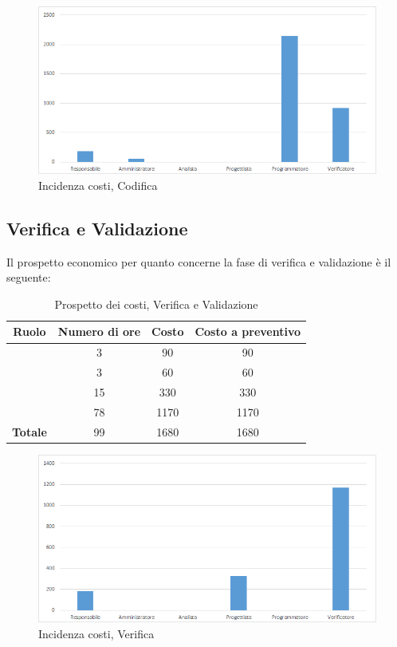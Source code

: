 \begin{figure}[H]
	\centering
	\includegraphics[scale=0.6]{img/8-4.png}
	\caption{Incidenza costi, Codifica}
\end{figure}

\subsection{Verifica e Validazione}
Il prospetto economico per quanto concerne la fase di verifica e validazione è il seguente:


\begin{table}[H]
	\begin{center}
		\begin{tabular}{|c|c|c|c|}
			\hline
			\textbf{Ruolo}	& \textbf{Numero di ore} & \textbf{Costo} & \textbf{Costo a preventivo}\\
			\hline
			\Res	&	3  &	90  &	90	\\
			\hline
			\Amm	&	3  &	60  &	60	\\
			\hline
			\Prog	&	15  &	330  &	330	\\
			\hline
			\Ver	&	78  &	1170  &	1170	\\
			\hline
			\textbf{Totale}  &	99  &	1680  &	1680	\\
			\hline
		\end{tabular}
	\end{center}
	\caption{Prospetto dei costi, Verifica e Validazione}
\end{table}

\begin{figure}[H]
	\centering
	\includegraphics[scale=0.6]{img/8-5.png}
	\caption{Incidenza costi, Verifica}
\end{figure}

